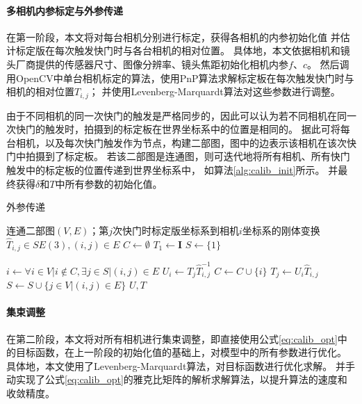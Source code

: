 \paragraph{多相机内参标定与外参传递}
在第一阶段，本文将对每台相机分别进行标定，获得各相机的内参初始化值
并估计标定版在每次触发快门时与各台相机的相对位置。
具体地，本文依据相机和镜头厂商提供的传感器尺寸、图像分辨率、镜头焦距初始化相机内参$f$、$c$。
然后调用OpenCV中单台相机标定的算法，使用PnP算法求解标定板在每次触发快门时与相机的相对位置$T_{i,j}$；
并使用Levenberg-Marquardt算法对这些参数进行调整。

由于不同相机的同一次快门的触发是严格同步的，因此可以认为若不同相机在同一次快门的触发时，拍摄到的标定板在世界坐标系中的位置是相同的。
据此可将每台相机，以及每次快门触发作为节点，构建二部图，图中的边表示该相机在该次快门中拍摄到了标定板。
若该二部图是连通图，则可迭代地将所有相机、所有快门触发中的标定板的位置传递到世界坐标系中，
如算法\ref{alg:calib_init}所示。
并最终获得$\delta$和$T$中所有参数的初始化值。

\begin{algorithm}[t]
    \caption{外参传递}
    \label{alg:calib_init}
    \begin{algorithmic}[1]
        \Require 连通二部图$(V,E)$；第$j$次快门时标定版坐标系到相机$i$坐标系的刚体变换$\hat{T}_{i,j}\in SE(3),(i,j)\in E$
            \State $C \gets \emptyset$
            \State $T_{1} \gets \mathbf{I}$
            \State $S \gets \{1\}$

                \State $i \gets \forall i\in V| i\notin C, \exists j\in S| (i,j)\in E$
                \State $U_{i} \gets T_{j}\hat{T}_{i,j}^{-1}$
                \State $C \gets C \cup \{i\}$
                    \State $T_{j} \gets U_{i}\hat{T}_{i,j}$
                \EndFor
                \State $S \gets S \cup \{j\in V| (i,j)\in E\}$
            \EndWhile
            \State \Return $U, T$
        \EndProcedure
    \end{algorithmic}
\end{algorithm}

\paragraph{集束调整}在第二阶段，本文将对所有相机进行集束调整，即直接使用公式\eqref{eq:calib_opt}中的目标函数，在上一阶段的初始化值的基础上，对模型中的所有参数进行优化。
具体地，本文使用了Levenberg-Marquardt算法\cite{lm}，对目标函数进行优化求解。
并手动实现了公式\eqref{eq:calib_opt}的雅克比矩阵的解析求解算法，以提升算法的速度和收敛精度。

